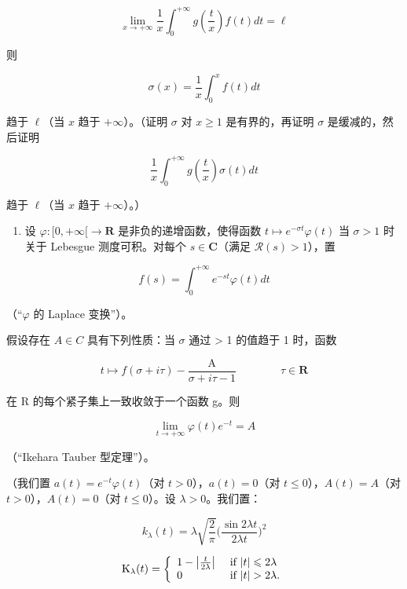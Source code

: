 \[
\lim _ {x \to + \infty} \frac {1}{x} \int_ {0} ^ {+ \infty} g \left(\frac {t}{x}\right) f (t) d t = \ell
\]

则

\[
\sigma (x) = \frac {1}{x} \int_ {0} ^ {x} f (t) d t
\]

趋于 \(\ell\)（当 \(x\) 趋于 \(+\infty\)）。（证明 \(\sigma\) 对 \(x \geqslant 1\) 是有界的，再证明 \(\sigma\) 是缓减的，然后证明

\[
\frac {1}{x} \int_ {0} ^ {+ \infty} g \left(\frac {t}{x}\right) \sigma (t) d t
\]

趋于 \(\ell\)（当 \(x\) 趋于 \(+\infty\)）。）

\begin{enumerate}
\def\labelenumi{\arabic{enumi})}
\setcounter{enumi}{8}
\tightlist
\item
  设 \(\varphi\colon[0,+\infty[\to\mathbf{R}\) 是非负的递增函数，使得函数 \(t\mapsto e^{-\sigma t}\varphi(t)\) 当 \(\sigma>1\) 时关于 Lebesgue 测度可积。对每个 \(s\in\mathbf{C}\)（满足 \(\mathcal{R}(s)>1\)），置
\end{enumerate}

\[
f (s) = \int_ {0} ^ {+ \infty} e ^ {- s t} \varphi (t) d t
\]

（“\(\varphi\) 的 Laplace 变换”）。

假设存在 \(A \in C\) 具有下列性质：当 \(\sigma\) 通过 \textgreater{} 1 的值趋于 1 时，函数

\[
t \mapsto f (\sigma + i \tau) - \frac {\mathrm{A}}{\sigma + i \tau - 1} \qquad \qquad \tau \in \mathbf {R}
\]

在 R 的每个紧子集上一致收敛于一个函数 g。则

\[
\lim _ {t \to + \infty} \varphi (t) e ^ {- t} = A
\]

（“Ikehara Tauber 型定理”）。

（我们置 \(a(t) = e^{-t}\varphi(t)\)（对 \(t > 0\)），\(a(t) = 0\)（对 \(t \leqslant 0\)），\(A(t) = A\)（对 \(t > 0\)），\(A(t) = 0\)（对 \(t \leqslant 0\)）。设 \(\lambda > 0\)。我们置：

\[
k _ {\lambda} (t) = \lambda \sqrt {\frac {2}{\pi}} \Big (\frac {\sin 2 \lambda t}{2 \lambda t} \Big) ^ {2}
\]

\[
\mathrm{K} _ {\lambda} (t) = \left\{ \begin{array}{l l} 1 - \left| \frac {t}{2 \lambda} \right| & \text { if } | t | \leqslant 2 \lambda \\ 0 & \text { if } | t | > 2 \lambda . \end{array} \right.
\]

